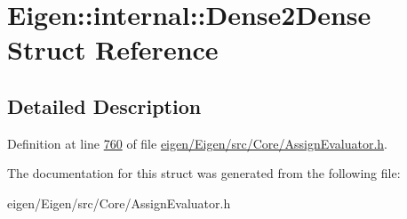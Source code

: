 \hypertarget{struct_eigen_1_1internal_1_1_dense2_dense}{}\section{Eigen\+:\+:internal\+:\+:Dense2\+Dense Struct Reference}
\label{struct_eigen_1_1internal_1_1_dense2_dense}


\subsection{Detailed Description}


Definition at line \hyperlink{eigen_2_eigen_2src_2_core_2_assign_evaluator_8h_source_l00760}{760} of file \hyperlink{eigen_2_eigen_2src_2_core_2_assign_evaluator_8h_source}{eigen/\+Eigen/src/\+Core/\+Assign\+Evaluator.\+h}.



The documentation for this struct was generated from the following file\+:\begin{DoxyCompactItemize}
\item 
eigen/\+Eigen/src/\+Core/\+Assign\+Evaluator.\+h\end{DoxyCompactItemize}
